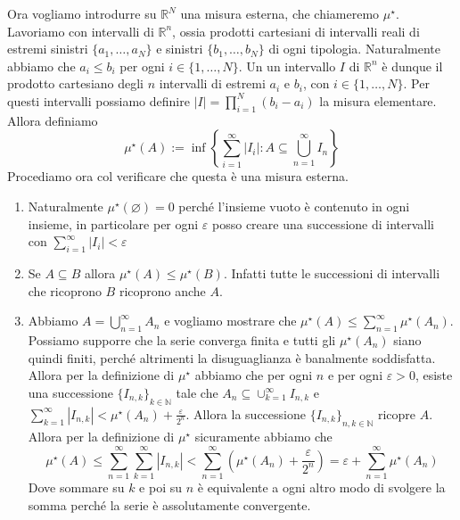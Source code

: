 Ora vogliamo introdurre su \(\mathbb{R}^{N}\) una misura esterna, che chiameremo
\(\mu^\star\). Lavoriamo con intervalli di \(\mathbb{R}^{n}\), ossia prodotti
cartesiani di intervalli reali di estremi sinistri \(\{a_{1}, \dots, a_{N}\} \)
e sinistri \(\{b_{1}, \dots, b_{N}\} \) di ogni tipologia. Naturalmente abbiamo
che \(a_{i} \le b_{i}\) per ogni \(i \in \{1, \dots, N\}\). Un un intervallo \(I\) di
\(\mathbb{R}^{n}\) è dunque il prodotto cartesiano degli \(n\) intervalli di
estremi \(a_{i}\) e \(b_{i}\), con \(i \in \{1, \dots, N\} \). Per questi
intervalli possiamo definire \(|I| = \prod_{i=1}^{N}(b_{i} - a_{i})\) la misura
elementare. Allora definiamo 
\[
    \mu^\star(A) := \inf\left\{ \sum_{i=1}^{\infty} |I_{i}| : A \subseteq
    \bigcup_{n = 1}^{\infty}I_{n} \right\}
\]
Procediamo ora col verificare che questa è una misura esterna.
\begin{enumerate}[label = \arabic*.]
    \item Naturalmente \(\mu^\star(\varnothing) = 0\) perché l'insieme vuoto è
        contenuto in ogni insieme, in particolare per ogni \(\varepsilon\) posso
        creare una successione di intervalli con \(\sum_{i=1}^{\infty} |I_{i}|
        <\varepsilon \) 
    \item Se \(A \subseteq B \) allora \(\mu^\star(A) \le \mu^\star(B)\).
        Infatti tutte le successioni di intervalli che ricoprono \(B\) ricoprono
        anche \(A\).
    \item Abbiamo \(A = \bigcup_{n=1}^{\infty}A_{n} \) e vogliamo mostrare che
        \(\mu^\star(A) \le \sum_{n=1}^{\infty} \mu^\star(A_{n}) \). Possiamo
        supporre che la serie converga finita e tutti gli \(\mu^\star(A_{n})\)
        siano quindi finiti, perché altrimenti la disuguaglianza è
        banalmente soddisfatta. Allora per la definizione di \(\mu^\star\)
        abbiamo che per ogni \(n\) e per ogni \(\varepsilon>0\), esiste una
        successione \({\{I_{n, k}\}}_{k \in \mathbb{N}} \) tale che \(A_{n}
        \subseteq \cup_{k=1}^{\infty} I_{n, k} \) e \(\sum_{k=1}^{\infty}
        |I_{n,k}| < \mu^\star(A_{n}) + \frac{\varepsilon}{2^{n}} \). Allora
        la successione \({\{I_{n, k}\}}_{n, k \in \mathbb{N}} \) ricopre \(A\).
        Allora per la definizione di \(\mu^\star\) sicuramente abbiamo che
        \[
            \mu^\star(A) \le \sum_{n=1}^{\infty} \sum_{k=1}^{\infty} |I_{n, k}|
            < \sum_{n=1}^{\infty} \left( \mu^\star(A_{n}) +
            \frac{\varepsilon}{2^{n}} \right) = \varepsilon + \sum_{n=1}^{\infty}
            \mu^\star(A_{n})
        \]
        Dove sommare su \(k\) e poi su \(n\) è equivalente a ogni altro modo di
        svolgere la somma perché la serie è assolutamente convergente.
\end{enumerate}
